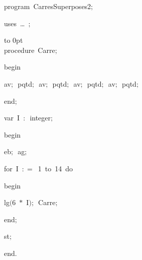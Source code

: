 
{
\parindent {}
\medskip

\carrenoir
\vspace{\neglskip}\mbox{\blc  \idt  \mcl program\idt \ CarresSuperposes2$;$
}\par 
\vspace{\neglskip}\mbox{\blc \blk\idt \mcl uses\idt \ \ldots\ $;$
}\par 
\medskip

\pagebreak[3] 
\vbox to 0pt{\mbox{}\\[3cm]%
}%
\vspace{\neglskip}\mbox{\blc  \blk\idt  \mcl procedure\idt \ Carre$;$}\par 
\vspace{\neglskip}\mbox{\blc  \blk\idt  \mcl begin\idt }\par 
\vspace{\neglskip}\mbox{\blc  \blk\blk\idt  av$;$\ pqtd$;$\ av$;$\ pqtd$;$\ av$;$\ pqtd$;$\ av$;$\ pqtd$;$\ }\par 
\vspace{\neglskip}\mbox{\blc  \blk\idt  \mcl end\idt $;$}\par 
\medskip

\pagebreak[3] 
\vspace{\neglskip}\mbox{\blc  \blk\idt  \mcl var\idt \ I\ $:$\ integer$;$}\par 
\medskip

\vspace{\neglskip}\mbox{\blc  \idt  \mcl begin\idt }\par 
\vspace{\neglskip}\mbox{\blc  \blk\idt  eb$;$\ ag$;$}\par 
\pagebreak[3] 
\vspace{\neglskip}\mbox{\blc  \blk\idt  \mcl for\idt \ I\ $:$$=$\ 1\ \mcl to\idt \ 14\ \mcl do\idt }\par 
\vspace{\neglskip}\mbox{\blc  \blk\blk\idt  \mcl begin\idt }\par 
\vspace{\neglskip}\mbox{\blc  \blk\blk\blk\idt  lg$($6\ $\ast$\ I$)$$;$\ Carre$;$}\par 
\vspace{\neglskip}\mbox{\blc  \blk\blk\idt  \mcl end\idt $;$}\par 
\vspace{\neglskip}\mbox{\blc  \blk\idt  st$;$}\par 
\vspace{\neglskip}\mbox{\blc  \idt  \mcl end\idt $.$}\par 

\medskip }


